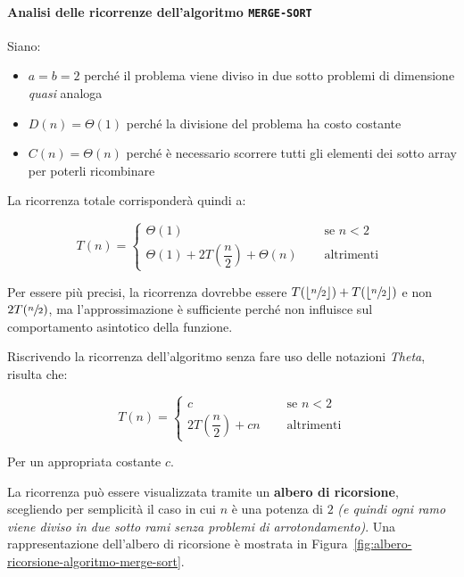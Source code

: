 \documentclass[italian, 10pt]{article}
\begin{document}
\paragraph{Analisi delle ricorrenze dell'algoritmo \texttt{MERGE-SORT}}

Siano:

\begin{itemize}
  \item \(a = b = 2\) perché il problema viene diviso in due sotto problemi di dimensione \textit{quasi} analoga
  \item \(D(n) = \Theta(1)\) perché la divisione del problema ha costo costante
  \item \(C(n) = \Theta(n)\) perché è necessario scorrere tutti gli elementi dei sotto array per poterli ricombinare
\end{itemize}

La ricorrenza totale corrisponderà quindi a:

\[T(n) = \begin{cases}
    \Theta(1)                                           & \quad \text{ se } n < 2   \\
    \Theta(1) + 2T\left(\dfrac{n}{2}\right) + \Theta(n) & \quad \text{ altrimenti }
  \end{cases}\]

Per essere più precisi, la ricorrenza dovrebbe essere \(T(\lfloor \sfrac{n}{2} \rfloor) + T(\lfloor \sfrac{n}{2} \rfloor)\) e non \(2T(\sfrac{n}{2})\), ma l'approssimazione è sufficiente perché non influisce sul comportamento asintotico della funzione.

\bigskip

Riscrivendo la ricorrenza dell'algoritmo senza fare uso delle notazioni \textit{Theta}, risulta che:

\[
  T(n) = \begin{cases}
    c                                & \quad \text{ se } n < 2  \\
    2T\left(\dfrac{n}{2}\right) + cn & \quad \text{ altrimenti}
  \end{cases}
\]

Per un appropriata costante \(c\).

La ricorrenza può essere visualizzata tramite un \textbf{albero di ricorsione}, scegliendo per semplicità il caso in cui \(n\) è una potenza di \(2\) \textit{(e quindi ogni ramo viene diviso in due sotto rami senza problemi di arrotondamento)}.
Una rappresentazione dell'albero di ricorsione è mostrata in Figura~\ref{fig:albero-ricorsione-algoritmo-merge-sort}.
\end{document}
